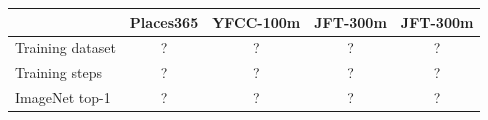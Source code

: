 \begin{tabular}{l c c c c}
\toprule
& Places365 & YFCC-100m & JFT-300m & JFT-300m \\
\midrule
Training dataset & ? & ? & ? & ? \\
Training steps & ? & ? & ? & ?  \\
ImageNet top-1 & ? & ? & ? & ? \\
\bottomrule
\end{tabular}
